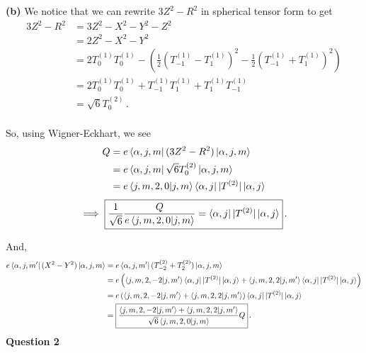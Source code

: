 \documentclass[10pt]{article}
\begin{document}
\textbf{(b)} We notice that we can rewrite $3Z^{2} - R^{2}$ in spherical tensor form to get
\begin{equation*}
  \begin{split}
    3Z^{2} - R^{2} & = 3Z^{2} - X^{2} - Y^{2} - Z^{2} \\
    & = 2Z^{2} - X^{2}- Y^{2} \\
    & = 2T_{0}^{(1)}T_{0}^{(1)} - \left(\frac{1}{2}\left(T_{-1}^{(1)} - T_{1}^{(1)}\right)^{2} - \frac{1}{2}\left(T_{-1}^{(1)} + T_{1}^{(1)}\right)^{2}\right) \\
    & = 2T_{0}^{(1)}T_{0}^{(1)} + T_{-1}^{(1)}T_{1}^{(1)} + T_{1}^{(1)}T_{-1}^{(1)}\\ 
    & = \boxed{\sqrt{6} T_{0}^{(2)}} \, .\\
  \end{split}
\end{equation*}

So, using Wigner-Eckhart, we see
\begin{equation*}
  \begin{split}
    Q & = e\bra{\alpha, j, m}(3Z^{2} - R^{2})\ket{\alpha, j, m} \\
    & = e\bra{\alpha, j ,m}\sqrt{6}T_{0}^{(2)}\ket{\alpha, j,m} \\
    & = e\braket{j,m,2,0|j,m}\bra{\alpha,j}|T^{(2)}|\ket{\alpha,j} \\
  \end{split}
\end{equation*}
\[ \implies \boxed{\frac{1}{\sqrt{6}}\frac{Q}{e\braket{j,m,2,0|j,m}} = \bra{\alpha,j}|T^{(2)}|\ket{\alpha,j}}\, . \]

And,
\begin{equation*}
  \begin{split}
    e\bra{\alpha, j, m'}(X^{2} - Y^{2})\ket{\alpha, j, m} & = e\bra{\alpha, j, m'}(T_{-2}^{(2)} + T_{2}^{(2)})\ket{\alpha, j, m} \\
    & = e\left(\braket{j,m,2,-2|j,m'}\bra{\alpha,j}|T^{(2)}|\ket{\alpha, j} + \braket{j,m,2,2|j,m'}\bra{\alpha,j}|T^{(2)}|\ket{\alpha, j}\right) \\
    & = e\left(\braket{j,m,2,-2|j,m'} + \braket{j,m,2,2|j,m'}\right)\bra{\alpha,j}|T^{(2)}|\ket{\alpha, j} \\
    & = \boxed{\frac{\braket{j,m,2,-2|j,m'} + \braket{j,m,2,2|j,m'}}{\sqrt{6}\braket{j,m,2,0|j,m}}Q} \, . \\
  \end{split}
\end{equation*}
\textbf{Question 2}
\end{document}
